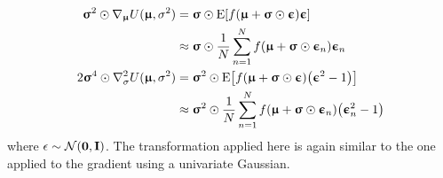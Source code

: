 \begin{equation}
    \begin{aligned}
        \sigmab^{2}\odot\nabla_\mub U(\mub,\sigma^2) &= \sigmab\odot\text{E}\bra{f(\mub + \sigmab\odot\epsilonb)\epsilonb}\\
        &\approx \sigmab\odot\frac{1}{N}\sum_{n=1}^N f(\mub+\sigmab\odot\epsilonb_n)\epsilonb_n\\
        2\sigmab^{4}\odot\nabla_\sigma^2 U(\mub,\sigma^2) &= \sigmab^{2}\odot\text{E}\bra{f(\mub + \sigmab\odot\epsilonb)\pa{\epsilonb^2 - 1}}\\
        &\approx \sigmab^{2}\odot\frac{1}{N}\sum_{n=1}^N f(\mub + \sigmab\odot\epsilonb_n)\pa{\epsilonb_n^2 - 1}\\
    \end{aligned}\label{eq: Theory: Variational optimization separable gaussian gradient estimators (natural gradient)}
\end{equation}
where $\epsilon\sim\mathcal{N}(\0,\I)$. The transformation applied here is again similar to the one applied to the gradient using a univariate Gaussian.








